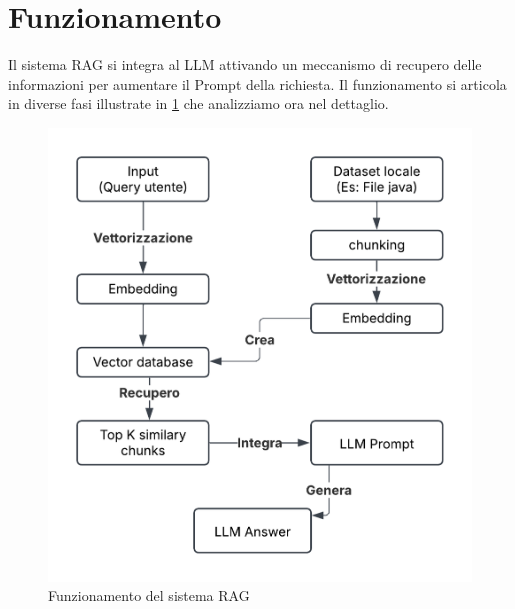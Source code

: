 \documentclass[12pt,a4paper,openright,twoside]{book}
\begin{document}
\section{Funzionamento}
Il sistema RAG si integra al LLM attivando un meccanismo di recupero delle informazioni per aumentare il Prompt della richiesta.
Il funzionamento si articola in diverse fasi illustrate in \cref{fig:SistemaRAG.png} che analizziamo ora nel dettaglio.
\begin{figure}[h]
    \centering
    \includegraphics[width=0.8\linewidth]{figures/SistemaRAG.png}
    \caption{Funzionamento del sistema RAG}
    \label{fig:SistemaRAG.png}
\end{figure}
\end{document}
